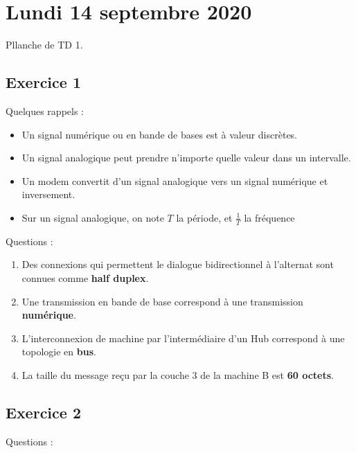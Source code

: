\section{Lundi 14 septembre 2020}

Pllanche de TD 1.

\subsection{Exercice 1}

Quelques rappels :

\begin{itemize}
\tightlist
	\item Un signal numérique ou en bande de bases est à valeur discrètes.
	\item Un signal analogique peut prendre n'importe quelle valeur dans un intervalle.
	\item Un modem convertit d'un signal analogique vers un signal numérique et inversement.
	\item Sur un signal analogique, on note $T$ la période, et $\frac{1}{T}$ la fréquence
\end{itemize}

Questions :

\begin{enumerate}
\tightlist

	\item Des connexions qui permettent le dialogue bidirectionnel à l'alternat sont connues comme \textbf{half duplex}.
	\item Une transmission en bande de base correspond à une transmission \textbf{numérique}.
	\item L'interconnexion de machine par l'intermédiaire d'un Hub correspond à une topologie en \textbf{bus}.
	\item La taille du message reçu par la couche 3 de la machine B est \textbf{60 octets}.

\end{enumerate}

\subsection{Exercice 2}

Questions :

